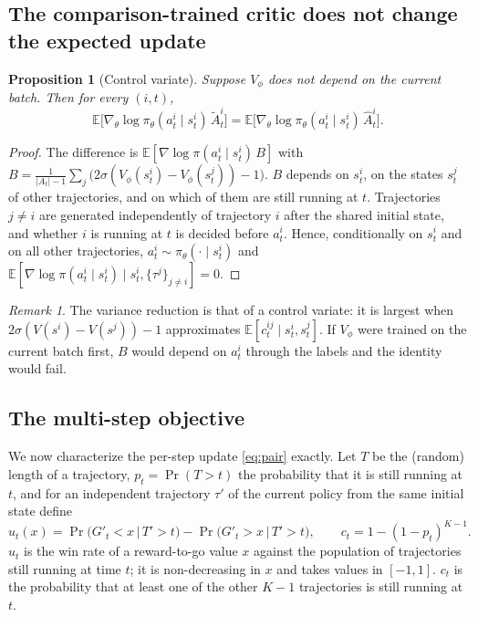 \documentclass[11pt]{article}
\newtheorem{proposition}{Proposition}
\theoremstyle{remark}
\newtheorem{remark}{Remark}
\newcommand{\E}{\mathbb{E}}
\begin{document}
\subsection{The comparison-trained critic does not change the expected update}
\begin{proposition}[Control variate]
\label{prop:cv}
Suppose $V_\phi$ does not depend on the current batch. Then for every $(i,t)$,
\[
\E\big[\nabla_\theta\log\pi_\theta(a^i_t\mid s^i_t)\,\tilde A^i_t\big]=\E\big[\nabla_\theta\log\pi_\theta(a^i_t\mid s^i_t)\,\hat A^i_t\big].
\]
\end{proposition}
\begin{proof}
The difference is $\E[\nabla\log\pi(a^i_t\mid s^i_t)\,B]$ with $B=\frac{1}{|A_t|-1}\sum_{j}\big(2\sigma(V_\phi(s^i_t)-V_\phi(s^j_t))-1\big)$. $B$ depends on $s^i_t$, on the states $s^j_t$ of other trajectories, and on which of them are still running at $t$. Trajectories $j\ne i$ are generated independently of trajectory $i$ after the shared initial state, and whether $i$ is running at $t$ is decided before $a^i_t$. Hence, conditionally on $s^i_t$ and on all other trajectories, $a^i_t\sim\pi_\theta(\cdot\mid s^i_t)$ and $\E[\nabla\log\pi(a^i_t\mid s^i_t)\mid s^i_t,\{\tau^j\}_{j\ne i}]=0$.
\end{proof}
\begin{remark}
The variance reduction is that of a control variate: it is largest when $2\sigma(V(s^i)-V(s^j))-1$ approximates $\E[c^{ij}_t\mid s^i_t,s^j_t]$. If $V_\phi$ were trained on the current batch first, $B$ would depend on $a^i_t$ through the labels and the identity would fail.
\end{remark}

\subsection{The multi-step objective}
\label{sec:multistep}
We now characterize the per-step update \eqref{eq:pair} exactly. Let $T$ be the (random) length of a trajectory, $p_t=\Pr(T>t)$ the probability that it is still running at $t$, and for an independent trajectory $\tau'$ of the current policy from the same initial state define
\begin{equation}
\label{eq:ut}
u_t(x)=\Pr\big(G'_t<x\,\big|\,T'>t\big)-\Pr\big(G'_t>x\,\big|\,T'>t\big),\qquad c_t=1-(1-p_t)^{K-1}.
\end{equation}
$u_t$ is the win rate of a reward-to-go value $x$ against the population of trajectories still running at time $t$; it is non-decreasing in $x$ and takes values in $[-1,1]$. $c_t$ is the probability that at least one of the other $K-1$ trajectories is still running at $t$.
\end{document}
